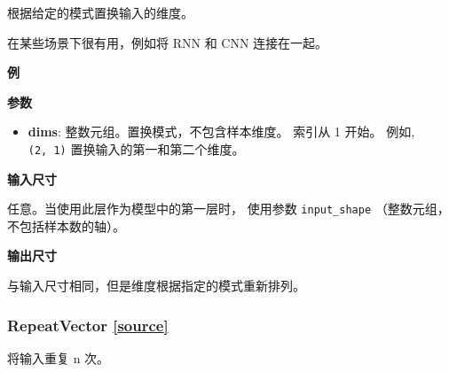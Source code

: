 \begin{Shaded}
\begin{Highlighting}[]
\end{Highlighting}
\end{Shaded}

根据给定的模式置换输入的维度。

在某些场景下很有用，例如将 RNN 和 CNN 连接在一起。

\textbf{例}

\begin{Shaded}
\begin{Highlighting}[]
\OperatorTok{=} 
\NormalTok{, }\OperatorTok{=}\NormalTok{(}\NormalTok{, }\NormalTok{)))}
\end{Highlighting}
\end{Shaded}

\textbf{参数}

\begin{itemize}
\tightlist
\item
  \textbf{dims}: 整数元组。置换模式，不包含样本维度。 索引从 1 开始。
  例如, \texttt{(2,\ 1)} 置换输入的第一和第二个维度。
\end{itemize}

\textbf{输入尺寸}

任意。当使用此层作为模型中的第一层时， 使用参数 \texttt{input\_shape}
（整数元组，不包括样本数的轴）。

\textbf{输出尺寸}

与输入尺寸相同，但是维度根据指定的模式重新排列。



\subsubsection{RepeatVector {\href{https://github.com/keras-team/keras/blob/master/keras/layers/core.py\#L500}{{[}source{]}}}}

\begin{Shaded}
\begin{Highlighting}[]
\end{Highlighting}
\end{Shaded}

将输入重复 n 次。

